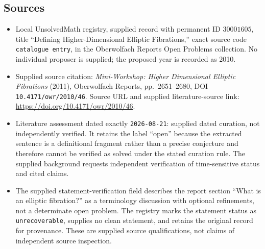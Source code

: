 \documentclass[11pt]{article}
\begin{document}
\subsection{Sources}
\begin{itemize}
\item Local UnsolvedMath registry, supplied record with permanent ID \(30001605\), title ``Defining Higher-Dimensional Elliptic Fibrations,'' exact source code \texttt{catalogue entry}, in the Oberwolfach Reports Open Problems collection. No individual proposer is supplied; the proposed year is recorded as 2010.
\item Supplied source citation: \emph{Mini-Workshop: Higher Dimensional Elliptic Fibrations} (2011), Oberwolfach Reports, pp.\ 2651--2680, DOI \texttt{10.4171/owr/2010/46}. Source URL and supplied literature-source link: \url{https://doi.org/10.4171/owr/2010/46}.
\item Literature assessment dated exactly \texttt{2026-08-21}: supplied dated curation, not independently verified. It retains the label ``open'' because the extracted sentence is a definitional fragment rather than a precise conjecture and therefore cannot be verified as solved under the stated curation rule. The supplied background requests independent verification of time-sensitive status and cited claims.
\item The supplied statement-verification field describes the report section ``What is an elliptic fibration?'' as a terminology discussion with optional refinements, not a determinate open problem. The registry marks the statement status as \texttt{unrecoverable}, supplies no clean statement, and retains the original record for provenance. These are supplied source qualifications, not claims of independent source inspection.
\end{itemize}
\end{document}
